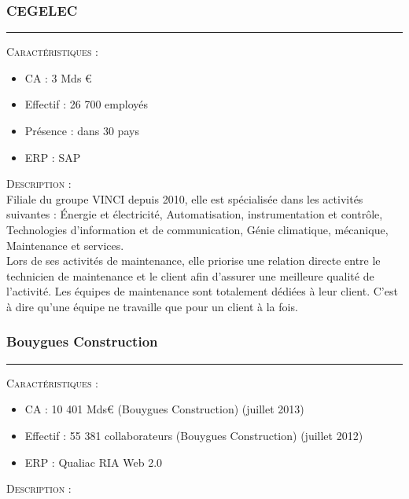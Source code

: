 \subsubsection{CEGELEC}
\hrule

\begin{shaded}
    \noindent\textsc{Caractéristiques} : \\
    \begin{itemize}
        \item CA : 3 Mds €
        \item Effectif : 26 700 employés
        \item Présence : dans 30 pays
        \item ERP : SAP
    \end{itemize}
\end{shaded}

\noindent\textsc{Description} : \\

Filiale du groupe VINCI depuis 2010, elle est spécialisée dans les activités suivantes : Énergie et électricité, Automatisation, instrumentation et contrôle, Technologies d’information et de communication, Génie climatique, mécanique, Maintenance et services. \\

Lors de ses activités de maintenance, elle priorise une relation directe entre le technicien de maintenance et le client afin d’assurer une meilleure qualité de l’activité. Les équipes de maintenance sont totalement dédiées à leur client. C’est à dire qu’une équipe ne travaille que pour un client à la fois.

\subsubsection{Bouygues Construction}
\hrule

\begin{shaded}
    \noindent\textsc{Caractéristiques} : \\
    \begin{itemize}
        \item CA : 10 401 Mds€ (Bouygues Construction) (juillet 2013)
        \item Effectif : 55 381 collaborateurs (Bouygues Construction) (juillet 2012)
        \item ERP : Qualiac RIA Web 2.0
    \end{itemize}
\end{shaded}

\noindent\textsc{Description} : \\

